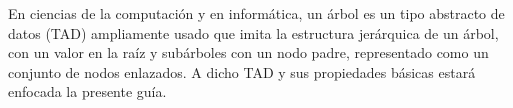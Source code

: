 En ciencias de la computación y en informática, un árbol es un tipo abstracto de datos (TAD) ampliamente usado que imita la estructura jerárquica de un árbol, con un valor en la raíz y subárboles con un nodo padre, representado como un conjunto de nodos enlazados. A dicho TAD y sus propiedades básicas estará enfocada la presente guía. 